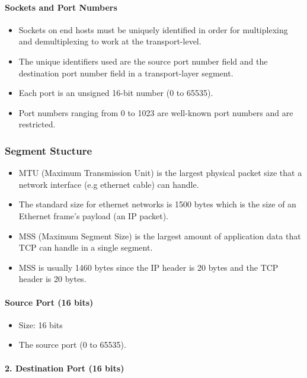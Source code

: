 \documentclass{article}
\begin{document}
\paragraph{Sockets and Port Numbers}

\begin{itemize}
    \item Sockets on end hosts must be uniquely identified in order for multiplexing and demultiplexing to work at the transport-level.
    \item The unique identifiers used are the source port number field and the destination port number field in a transport-layer segment.
    \item Each port is an unsigned 16-bit number (0 to 65535).
    \item Port numbers ranging from 0 to 1023 are well-known port numbers and are restricted.
\end{itemize}

\subsubsection{Segment Stucture}

\begin{itemize}
    \item MTU (Maximum Transmission Unit) is the largest physical packet size that a network interface (e.g ethernet cable) can handle.
    \item The standard size for ethernet networks is 1500 bytes which is the size of an Ethernet frame's payload (an IP packet).
    \item MSS (Maximum Segment Size) is the largest amount of application data that TCP can handle in a single segment.
    \item MSS is usually 1460 bytes since the IP header is 20 bytes and the TCP header is 20 bytes.
\end{itemize}

\paragraph{Source Port (16 bits)}

\begin{itemize}
    \item  Size: 16 bits
    \item The source port (0 to 65535).
\end{itemize}

\paragraph{2. Destination Port (16 bits)}
\end{document}

